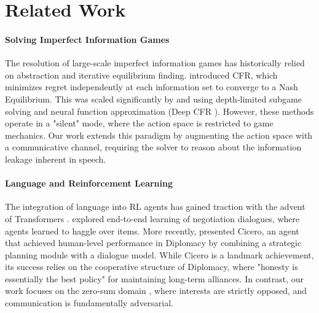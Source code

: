 \documentclass{article}
\begin{document}
\section{Related Work}

\paragraph{Solving Imperfect Information Games}
The resolution of large-scale imperfect information games has historically relied on abstraction and iterative equilibrium finding. \citet{zinkevich2007regret} introduced CFR, which minimizes regret independently at each information set to converge to a Nash Equilibrium. This was scaled significantly by \citet{moravcik2017deepstack} and \citet{brown2018superhuman} using depth-limited subgame solving and neural function approximation (Deep CFR \citep{brown2019deep}). However, these methods operate in a "silent" mode, where the action space is restricted to game mechanics. Our work extends this paradigm by augmenting the action space with a communicative channel, requiring the solver to reason about the information leakage inherent in speech.

\paragraph{Language and Reinforcement Learning}
The integration of language into RL agents has gained traction with the advent of Transformers \citep{vaswani2017attention, sutskever2014sequence}. \citet{lewis2017deal} explored end-to-end learning of negotiation dialogues, where agents learned to haggle over items. More recently, \citet{bakhtin2022mastering} presented Cicero, an agent that achieved human-level performance in Diplomacy by combining a strategic planning module with a dialogue model. While Cicero is a landmark achievement, its success relies on the cooperative structure of Diplomacy, where "honesty is essentially the best policy" for maintaining long-term alliances. In contrast, our work focuses on the zero-sum domain \citep{foerster2016learning}, where interests are strictly opposed, and communication is fundamentally adversarial.
\end{document}
